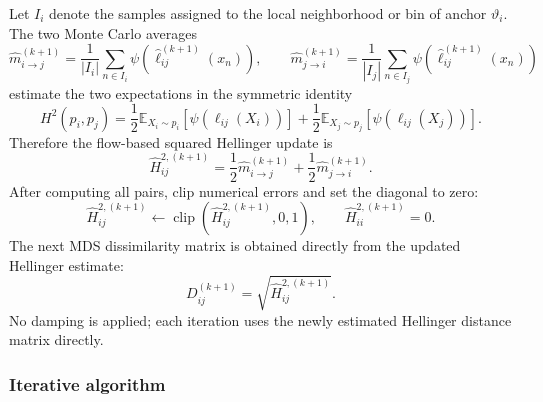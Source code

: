 Let $I_i$ denote the samples assigned to the local neighborhood or bin of anchor $\vartheta_i$. The two Monte Carlo averages
\begin{equation}
    \widehat m_{i\to j}^{(k+1)}
    =
    \frac{1}{|I_i|}
    \sum_{n\in I_i}
    \psi\!\left(\widehat{\ell}_{ij}^{(k+1)}(x_n)\right),
    \qquad
    \widehat m_{j\to i}^{(k+1)}
    =
    \frac{1}{|I_j|}
    \sum_{n\in I_j}
    \psi\!\left(\widehat{\ell}_{ij}^{(k+1)}(x_n)\right)
\end{equation}
estimate the two expectations in the symmetric identity
\begin{equation}
    H^2(p_i,p_j)
    =
    \frac{1}{2}
    \mathbb E_{X_i\sim p_i}
    \left[
    \psi(\ell_{ij}(X_i))
    \right]
    +
    \frac{1}{2}
    \mathbb E_{X_j\sim p_j}
    \left[
    \psi(\ell_{ij}(X_j))
    \right].
\end{equation}
Therefore the flow-based squared Hellinger update is
\begin{equation}
\label{eq:H-update}
    \widehat H_{ij}^{2,(k+1)}
    =
    \frac{1}{2}
    \widehat m_{i\to j}^{(k+1)}
    +
    \frac{1}{2}
    \widehat m_{j\to i}^{(k+1)}.
\end{equation}
After computing all pairs, clip numerical errors and set the diagonal to zero:
\begin{equation}
    \widehat H_{ij}^{2,(k+1)}
    \leftarrow
    \operatorname{clip}\!\left(
    \widehat H_{ij}^{2,(k+1)},
    0,1
    \right),
    \qquad
    \widehat H_{ii}^{2,(k+1)}=0.
\end{equation}
The next MDS dissimilarity matrix is obtained directly from the updated Hellinger estimate:
\begin{equation}
    D_{ij}^{(k+1)}
    =
    \sqrt{\widehat H_{ij}^{2,(k+1)}}.
\end{equation}
No damping is applied; each iteration uses the newly estimated Hellinger distance matrix directly.

\subsubsection{Iterative algorithm}


